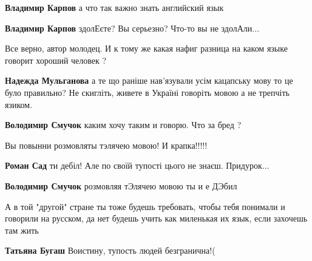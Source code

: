 \begin{itemize}
\begin{itemize}
\textbf{Владимир Карпов} а что так важно знать английский язык

\textbf{Владимир Карпов} здолЕєте? Вы серьезно? Что-то вы не здолАли...
\end{itemize}

Все верно, автор молодец. И к тому же какая нафиг разница на каком языке
говорит хороший человек ?

\begin{itemize}
\textbf{Надежда Мульганова} а те що раніше нав'язували усім кацапську мову то це було правильно? Не скигліть, живете в Україні говоріть мовою а не трепчіть язиком.

\textbf{Володимир Смучок} каким хочу таким и говорю. Что за бред ?
\end{itemize}

Вы повынни розмовляты тэлячею мовою! И крапка!!!!!🐃

\begin{itemize}
\textbf{Роман Сад} ти дебіл! Але по своїй тупості цього не знаєш. Придурок...

\textbf{Володимир Смучок} розмовляя тЭлячею мовою ты и е ДЭбил
\end{itemize}


А в той "другой" стране ты тоже будешь требовать, чтобы тебя понимали и
говорили на русском, да нет будешь учить как миленькая их язык, если захочешь
там жить

\begin{itemize}
\textbf{Татьяна Бугаш} Воистину, тупость людей безгранична!(


\end{itemize}
\end{itemize}
